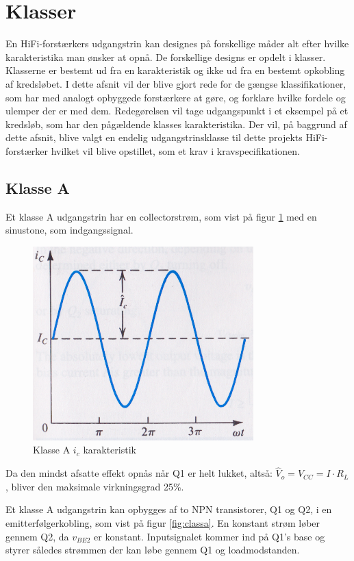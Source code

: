\section{Klasser}
\label{klasser}
En HiFi-forstærkers udgangstrin kan designes på forskellige måder alt efter hvilke karakteristika man ønsker at opnå. De forskellige designs er opdelt i klasser. Klasserne er bestemt ud fra en karakteristik og ikke ud fra en bestemt opkobling af kredsløbet. 
I dette afsnit vil der blive gjort rede for de gængse klassifikationer, som har med analogt opbyggede forstærkere at gøre, og forklare hvilke fordele og ulemper der er med dem. Redegørelsen vil tage udgangspunkt i et eksempel på et kredsløb, som har den pågældende klasses karakteristika. 
Der vil, på baggrund af dette afsnit, blive valgt en endelig udgangstrinsklasse til dette projekts HiFi-forstærker hvilket vil blive opstillet, som et krav i kravspecifikationen.

\subsection{Klasse A}

Et klasse A udgangstrin har en collectorstrøm, som vist på figur \ref{fig:klassea} med en sinustone, som indgangssignal. 

\begin{figure}[h]
\centering
\includegraphics[scale=.35]{indledende_analyse/klasser/klassea.png}
\caption{Klasse A $i_c$ karakteristik}
\label{fig:klassea}
\end{figure}

Da den mindst afsatte effekt opnås når Q1 er helt lukket, altså: $ \hat{V}_o=V_{CC}=I \cdot R_L $, bliver den maksimale virkningsgrad 25\%.

Et klasse A udgangstrin kan opbygges af to NPN transistorer, Q1 og Q2, i en emitterfølgerkobling, som vist på figur \ref{fig:classa}. En konstant strøm løber gennem Q2, da $v_{BE2}$ er konstant. Inputsignalet kommer ind på Q1's base og styrer således strømmen der kan løbe gennem Q1 og loadmodstanden. 

